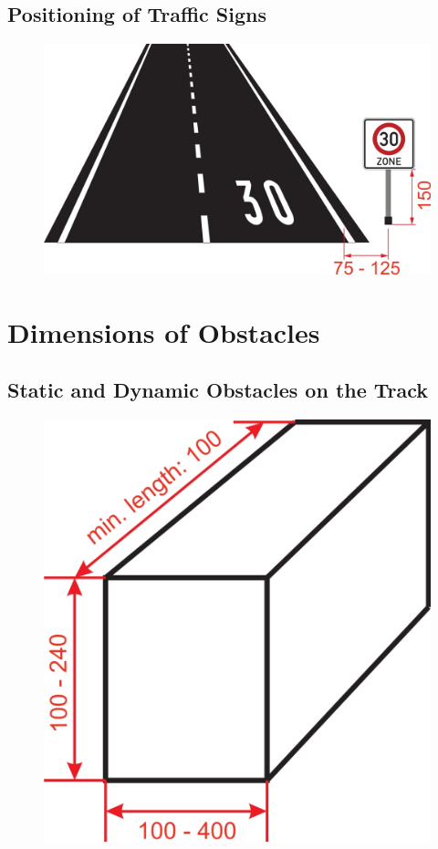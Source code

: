 \subsection{Positioning of Traffic Signs}
\begin{figure}[H]
	\begin{center}
		\centering\includegraphics[]{graphics/Abb_19_positioning_of_traffic_signs.jpg}
	\end{center}
\end{figure}

\section{Dimensions of Obstacles}
\subsection{Static and Dynamic Obstacles on the Track}
\label{fig_obstacle_dimensions}
\begin{figure}[H]
	\begin{center}
		\centering\includegraphics[]{graphics/Abb_20_obstacles.jpg}
	\end{center}
\end{figure}

